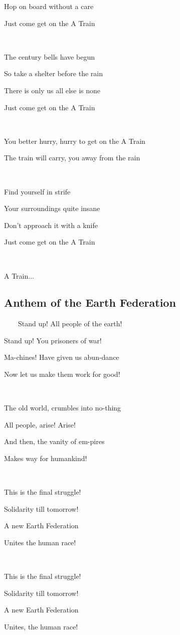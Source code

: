 \documentclass[11pt]{article}
\begin{document}
	Hop on board without a care
	
	Just come get on the A Train
	
	\ 
	
	The century bells have begun

	So take a shelter before the rain

	There is only us all else is none

	Just come get on the A Train

	\ 
		
	You better hurry, hurry to get on the A Train

	The train will carry, you away from the rain
	
	\ 
	
	Find yourself in strife
	
	Your surroundings quite insane
	
	Don't approach it with a knife
	
	Just come get on the A Train
	
	\ 
	
	A Train...
	\newpage

	\subsection{Anthem of the Earth Federation}
	\ \ \ \ Stand up! All people of the earth!
	
	Stand up! You prisoners of war!
	
	Ma-chines! Have given us abun-dance
	
	Now let us make them work for good!
	
	\ 
	
	The old world, crumbles into no-thing
	
	All people, arise! Arise!

	And then, the vanity of em-pires

	Makes way for humankind!	
	
	\ 
	
	This is the final struggle! 
	
	Solidarity till tomorrow!
	
	A new Earth Federation
	
	Unites the human race!
	
	\ 
	
	This is the final struggle!
	
	Solidarity till tomorrow!
	
	A new Earth Federation
	
	Unites, the human race!
	
\end{document}
